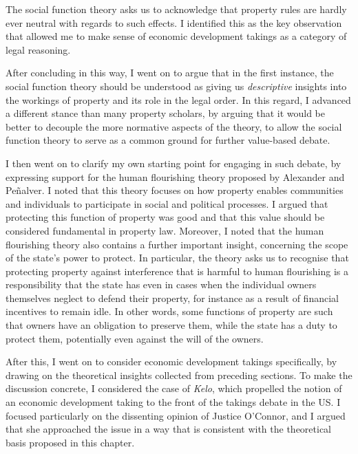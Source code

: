 The social function theory asks us to acknowledge that property rules are hardly ever neutral with regards to such effects. I identified this as the key observation that allowed me to make sense of economic development takings as a category of legal reasoning.

After concluding in this way, I went on to argue that in the first instance, the social function theory should be understood as giving us {\it descriptive} insights into the workings of property and its role in the legal order. In this regard, I advanced a different stance than many property scholars, by arguing that it would be better to decouple the more normative aspects of the theory, to allow the social function theory to serve as a common ground for further value-based debate. 

I then went on to clarify my own starting point for engaging in such debate, by expressing support for the human flourishing theory proposed by Alexander and Pe\~{n}alver. I noted that this theory focuses on how property enables communities and individuals to participate in social and political processes. I argued that protecting this function of property was good and that this value should be considered fundamental in property law. Moreover, I noted that the human flourishing theory also contains a further important insight, concerning the scope of the state's power to protect. In particular, the theory asks us to recognise that protecting property against interference that is harmful to human flourishing is a responsibility that the state has even in cases when the individual owners themselves neglect to defend their property, for instance as a result of financial incentives to remain idle. In other words, some functions of property are such that owners have an obligation to preserve them, while the state has a duty to protect them, potentially even against the will of the owners.

After this, I went on to consider economic development takings specifically, by drawing on the theoretical insights collected from preceding sections. To make the discussion concrete, I considered the case of {\it Kelo}, which propelled the notion of an economic development taking to the front of the takings debate in the US. I focused particularly on the dissenting opinion of Justice O'Connor, and I argued that she approached the issue in a way that is consistent with the theoretical basis proposed in this chapter.

